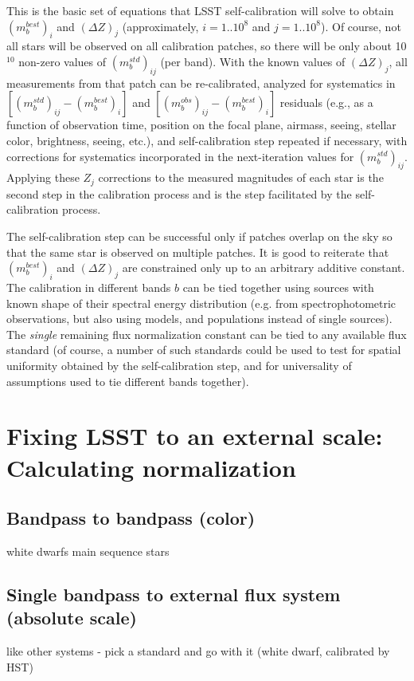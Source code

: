 \documentclass[12pt,preprint]{aastex}
\begin{document}
This is the basic set of equations that LSST self-calibration 
will solve to obtain $(m_b^{best})_{i}$ and $(\Delta Z)_j$
(approximately, $i=1..10^8$ and $j=1..10^8$). Of course, not 
all stars will be observed on all calibration patches, so there 
will be only about 10$^{10}$ non-zero values of $(m_b^{std})_{ij}$
(per band). 
With the known values of $(\Delta Z)_j$, all measurements from that 
patch can be re-calibrated, analyzed for systematics in 
$[(m_b^{std})_{ij} - (m_b^{best})_{i}]$ and $[(m_b^{obs})_{ij} - (m_b^{best})_{i}]$ 
residuals (e.g., as a function
of observation time, position on the focal plane, airmass, seeing,
stellar color, brightness, seeing, etc.), and self-calibration
step repeated if necessary, with corrections for systematics incorporated 
in the next-iteration values for $(m_b^{std})_{ij}$. 
Applying these $Z_j$ corrections to the measured
magnitudes of each star is the second step in 
the calibration process and is the step facilitated by the self-calibration process. 

The self-calibration step can be successful only if patches
overlap on the sky so that the same star is observed on 
multiple patches. It is good to reiterate that $(m_b^{best})_{i}$ and 
$(\Delta Z)_j$ are constrained only up to an arbitrary 
additive constant. The calibration in different bands $b$
can be tied together using sources with known shape of their 
spectral energy distribution (e.g. from spectrophotometric
observations, but also using models, and populations instead
of single sources). The {\it single} remaining flux normalization
constant can be tied to any available flux standard (of course,
a number of such standards could be used to test for spatial
uniformity obtained by the self-calibration step, and for 
universality of assumptions used to tie different bands together).




\section{Fixing LSST to an external scale: Calculating normalization}
\subsection{Bandpass to bandpass (color)}
white dwarfs
main sequence stars
\subsection{Single bandpass to external flux system (absolute scale)}
like other systems - pick a standard and go with it (white dwarf,
calibrated by HST)
\end{document}
